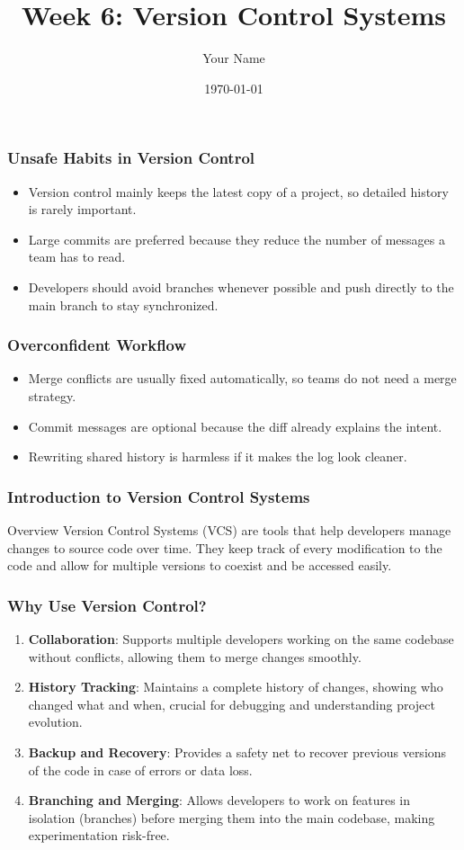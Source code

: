 \documentclass{beamer}
\title{Week 6: Version Control Systems}
\author{Your Name}
\institute{Your Institution}
\date{\today}
\begin{document}
\frame{\titlepage}

\begin{frame}[fragile]
    \frametitle{Unsafe Habits in Version Control}
    \begin{itemize}
        \item Version control mainly keeps the latest copy of a project, so detailed history is rarely important.
        \item Large commits are preferred because they reduce the number of messages a team has to read.
        \item Developers should avoid branches whenever possible and push directly to the main branch to stay synchronized.
    \end{itemize}
\end{frame}

\begin{frame}[fragile]
    \frametitle{Overconfident Workflow}
    \begin{itemize}
        \item Merge conflicts are usually fixed automatically, so teams do not need a merge strategy.
        \item Commit messages are optional because the diff already explains the intent.
        \item Rewriting shared history is harmless if it makes the log look cleaner.
    \end{itemize}
\end{frame}

\begin{frame}[fragile]
    \frametitle{Introduction to Version Control Systems}
    \begin{block}{Overview}
        Version Control Systems (VCS) are tools that help developers manage changes to source code over time. They keep track of every modification to the code and allow for multiple versions to coexist and be accessed easily.
    \end{block}
\end{frame}

\begin{frame}[fragile]
    \frametitle{Why Use Version Control?}
    \begin{enumerate}
        \item \textbf{Collaboration}: Supports multiple developers working on the same codebase without conflicts, allowing them to merge changes smoothly.
        \item \textbf{History Tracking}: Maintains a complete history of changes, showing who changed what and when, crucial for debugging and understanding project evolution.
        \item \textbf{Backup and Recovery}: Provides a safety net to recover previous versions of the code in case of errors or data loss.
        \item \textbf{Branching and Merging}: Allows developers to work on features in isolation (branches) before merging them into the main codebase, making experimentation risk-free.
    \end{enumerate}
\end{frame}
\end{document}
